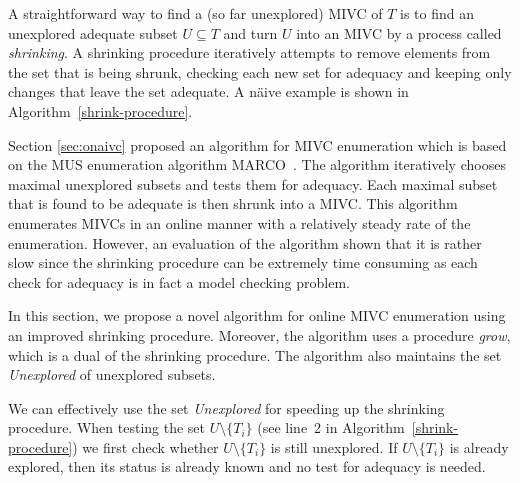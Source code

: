 A straightforward way to find a (so far unexplored) MIVC of $T$ is to find an unexplored adequate subset $U \subseteq T$ and turn $U$  into an MIVC by a process called \emph{shrinking}.  A shrinking procedure iteratively attempts to remove elements from the set that is being shrunk, checking each new set for adequacy and keeping only changes that
leave the set adequate. A n\"aive example is shown in Algorithm~\ref{shrink-procedure}.

Section \ref{sec:onaivc} proposed an algorithm for MIVC enumeration which is based on the MUS enumeration algorithm MARCO~\cite{Liffiton2016}. The algorithm iteratively chooses maximal unexplored subsets and tests them for adequacy. Each maximal subset that is found to be adequate is then shrunk into a MIVC. This algorithm enumerates MIVCs in an online manner with a relatively steady rate of the enumeration. However, an evaluation of the algorithm shown that it is rather slow since the shrinking procedure can be extremely time consuming as each check for adequacy is in fact a model checking problem.



In this section, we propose a novel algorithm for online MIVC enumeration using an improved shrinking procedure. Moreover, the algorithm uses a procedure \emph{grow}, which is a dual of the shrinking procedure. The algorithm also maintains the set \emph{Unexplored} of unexplored subsets.

We can effectively use the set  \textit{Unexplored} for speeding up the shrinking procedure. When testing the set $U \setminus \{T_i\}$ (see line~2 in Algorithm~\ref{shrink-procedure}) we first check whether  $U \setminus \{T_i\}$ is still unexplored. If $U \setminus \{T_i\}$ is already explored, then its status is already known and no test for adequacy is needed.

